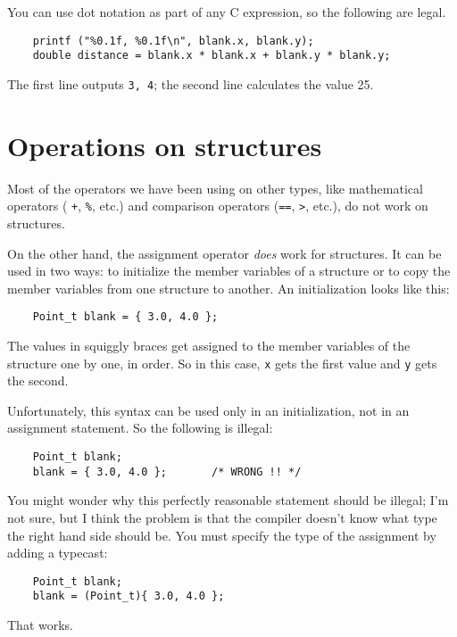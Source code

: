 You can use dot notation as part of any C expression, so the
following are legal.

\begin{verbatim}
	printf ("%0.1f, %0.1f\n", blank.x, blank.y);
	double distance = blank.x * blank.x + blank.y * blank.y;
\end{verbatim}
%
The first line outputs {\tt 3, 4}; the second line calculates
the value 25.

\section{Operations on structures}

Most of the operators we have been using on other types, like
mathematical operators ( {\tt +}, {\tt \%}, etc.) and comparison
operators ({\tt ==}, {\tt >}, etc.), do not work on structures.

On the other hand, the assignment operator {\em does} work for
structures.  It can be used in two ways: to initialize the member
variables of a structure or to copy the member variables from one
structure to another.  An initialization looks like this:

\begin{verbatim}
	Point_t blank = { 3.0, 4.0 };
\end{verbatim}
%
The values in squiggly braces get assigned to the member variables of
the structure one by one, in order.  So in this case, {\tt x}
gets the first value and {\tt y} gets the second.

Unfortunately, this syntax can be used only in an initialization,
not in an assignment statement.  So the following is illegal:

\begin{verbatim}
	Point_t blank;
	blank = { 3.0, 4.0 };       /* WRONG !! */
\end{verbatim}
%
You might wonder why this perfectly reasonable statement should
be illegal; I'm not sure, but I think the problem is that the compiler
doesn't know what type the right hand side should be.  You must specify
the type of the assignment by adding a typecast:

\begin{verbatim}
	Point_t blank;
	blank = (Point_t){ 3.0, 4.0 };
\end{verbatim}
%
That works.

